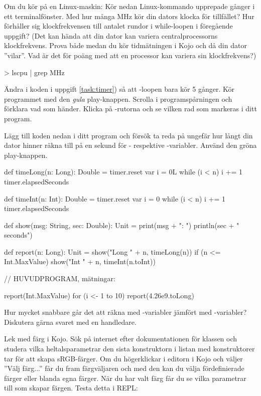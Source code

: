 \Subtask  Om du kör på en Linux-maskin: Kör nedan Linux-kommando upprepade gånger i ett terminalfönster. Med hur många MHz kör din dators klocka för tillfället? Hur förhåller sig klockfrekvensen till antalet rundor i while-loopen i föregående uppgift? (Det kan hända att din dator kan variera centralprocessorns klockfrekvens. Prova både medan du kör tidmätningen i Kojo och då din dator ''vilar''. Vad är det för poäng med att en processor kan variera sin klockfrekvens?)
\begin{REPLnonum}
> lscpu | grep MHz
\end{REPLnonum}


\Subtask Ändra i koden i uppgift \ref{task:timer}) så att -loopen bara kör 5 gånger. Kör programmet med den \emph{gula} play-knappen. Scrolla i programspårningen och förklara vad som händer. Klicka på -rutorna och se vilken rad som markeras i ditt program.

\Subtask Lägg till koden nedan i ditt program och försök ta reda på ungefär hur långt din dator hinner räkna till på en sekund för - respektive -variabler. Använd den gröna play-knappen.
\begin{CodeSmall}
def timeLong(n: Long): Double = {
  timer.reset
  var i = 0L
  while (i < n) { i += 1 }
  timer.elapsedSeconds
}

def timeInt(n: Int): Double = {
  timer.reset
  var i = 0
  while (i < n) { i += 1 }
  timer.elapsedSeconds
}

def show(msg: String, sec: Double): Unit = {
  print(msg + ": ")
  println(sec + " seconds")
}

def report(n: Long): Unit = {
  show("Long " + n, timeLong(n))
  if (n <= Int.MaxValue) show("Int  " + n, timeInt(n.toInt))
}

// HUVUDPROGRAM, mätningar:

report(Int.MaxValue)
for (i <- 1 to 10) report(4.26e9.toLong)
\end{CodeSmall}

\Subtask Hur mycket snabbare går det att räkna med -variabler jämfört med -variabler? Diskutera gärna svaret med en handledare.

\Task Lek med färg i Kojo. Sök på internet efter dokumentationen för klassen  och studera vilka heltalsparametrar den sista konstruktorn i listan med konstruktorer tar för att skapa sRGB-färger. Om du högerklickar i editorn i Kojo och väljer ''Välj färg...'' får du fram färgväljaren och med den kan du välja fördefinierade färger eller blanda egna färger. När du har valt färg får du se vilka parametrar till  som skapar färgen. Testa detta i REPL:

